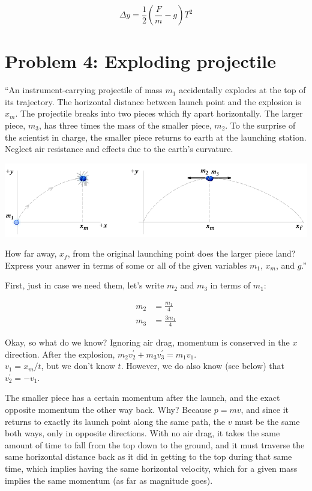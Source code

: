 \documentclass[8.01x]{subfiles}
\begin{document}
\begin{equation}
\Delta y = \frac{1}{2} (\frac{F}{m} - g) T^2
\end{equation}

\section{Problem 4: Exploding projectile}

``An instrument-carrying projectile of mass $m_1$ accidentally explodes at the top of its trajectory. The horizontal distance between launch point and the explosion is $x_m$. The projectile breaks into two pieces which fly apart horizontally. The larger piece, $m_3$, has three times the mass of the smaller piece, $m_2$. To the surprise of the scientist in charge, the smaller piece returns to earth at the launching station. Neglect air resistance and effects due to the earth's curvature.

\begin{center}
\includegraphics[scale=0.6]{Graphics/h6p4}
\end{center}

How far away, $x_f$, from the original launching point does the larger piece land? Express your answer in terms of some or all of the given variables $m_1$, $x_m$, and $g$.''

First, just in case we need them, let's write $m_2$ and $m_3$ in terms of $m_1$:

\begin{align}
m_2 &= \frac{m_1}{4}\\
m_3 &= \frac{3 m_1}{4}
\end{align}

Okay, so what do we know? Ignoring air drag, momentum is conserved in the $x$ direction. After the explosion, $m_2 v_2^{'} + m_3 v_3^{'} = m_1 v_1$.\\
$v_1 = x_m/t$, but we don't know $t$. However, we do also know (see below) that $v_2^{'} = - v_1$.

The smaller piece has a certain momentum after the launch, and the exact opposite momentum the other way back. Why? Because $p = m v$, and since it returns to exactly its launch point along the same path, the $v$ must be the same both ways, only in opposite directions. With no air drag, it takes the same amount of time to fall from the top down to the ground, and it must traverse the same horizontal distance back as it did in getting to the top during that same time, which implies having the same horizontal velocity, which for a given mass implies the same momentum (as far as magnitude goes).
\end{document}
